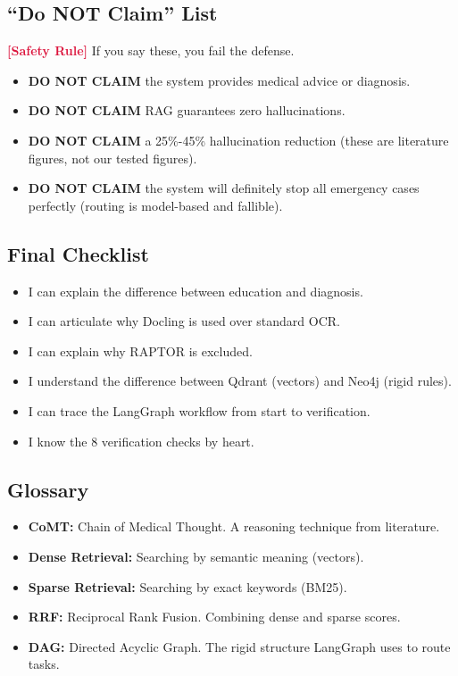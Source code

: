 \documentclass[11pt,a4paper]{article}
\newcommand{\origintag}[2]{\textcolor{#1}{\small\textbf{[#2]}}}
\begin{document}
\subsection{``Do NOT Claim'' List}
\begin{warning}
\origintag{crimson}{Safety Rule} If you say these, you fail the defense.
\begin{itemize}[noitemsep]
    \item \textbf{DO NOT CLAIM} the system provides medical advice or diagnosis.
    \item \textbf{DO NOT CLAIM} RAG guarantees zero hallucinations.
    \item \textbf{DO NOT CLAIM} a 25\%-45\% hallucination reduction (these are literature figures, not our tested figures).
    \item \textbf{DO NOT CLAIM} the system will definitely stop all emergency cases perfectly (routing is model-based and fallible).
\end{itemize}
\end{warning}

\subsection{Final Checklist}
\begin{itemize}[noitemsep]
    \item [ ] I can explain the difference between education and diagnosis.
    \item [ ] I can articulate why Docling is used over standard OCR.
    \item [ ] I can explain why RAPTOR is excluded.
    \item [ ] I understand the difference between Qdrant (vectors) and Neo4j (rigid rules).
    \item [ ] I can trace the LangGraph workflow from start to verification.
    \item [ ] I know the 8 verification checks by heart.
\end{itemize}

\subsection{Glossary}
\begin{itemize}[noitemsep]
    \item \textbf{CoMT:} Chain of Medical Thought. A reasoning technique from literature.
    \item \textbf{Dense Retrieval:} Searching by semantic meaning (vectors).
    \item \textbf{Sparse Retrieval:} Searching by exact keywords (BM25).
    \item \textbf{RRF:} Reciprocal Rank Fusion. Combining dense and sparse scores.
    \item \textbf{DAG:} Directed Acyclic Graph. The rigid structure LangGraph uses to route tasks.
\end{itemize}
\end{document}
